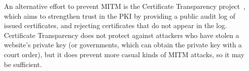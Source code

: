 An alternative effort to prevent MITM is the Certificate Transparency project~\cite{CertTrans},
which aims to strengthen trust in the PKI by providing a public audit log of issued certificates,
and rejecting certificates that do not appear in the log. Certificate Transparency does not protect
against attackers who have stolen a website's private key (or governments, which can obtain the
private key with a court order), but it does prevent more casual kinds of MITM attacks, so it may be
sufficient.

\pagebreak

